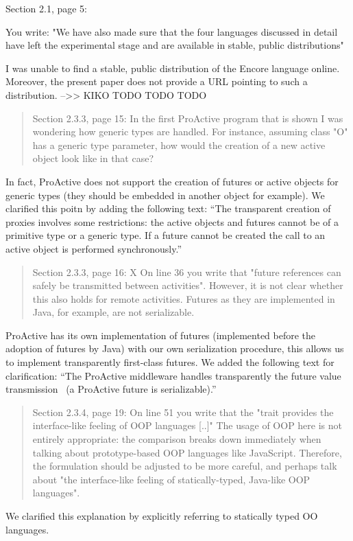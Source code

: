 \documentclass{article}
\begin{document}
Section 2.1, page 5:

You write: "We have also made sure that the four languages discussed in detail have left 
the experimental stage and are available in stable, public distributions"

I was unable to find a stable, public distribution of the Encore language online. 
Moreover, the present paper does not provide a URL pointing to such a distribution.
-->> KIKO
TODO TODO TODO


\begin{quote}
	Section 2.3.3, page 15:
In the first ProActive program that is shown I was wondering how generic types are 
handled. For instance, assuming class "O" has a generic type parameter, how would the 
creation of a new active object look like in that case?
\end{quote}
In fact, ProActive does not support the creation of futures or active objects for generic 
types (they should be embedded in another object for example). We clarified this poitn by 
adding the following text: ``The transparent creation of proxies 
involves some restrictions: the  active 
objects and futures cannot be of a primitive type or a generic type. If a future cannot 
be created the call to an active object is performed synchronously.''

\begin{quote}
	Section 2.3.3, page 16:
X On line 36 you write that "future references can safely be transmitted between 
activities". However, it is not clear whether this also holds for remote activities. 
Futures as they are implemented in Java, for example, are not serializable.
\end{quote}
ProActive has its own implementation of futures (implemented before the adoption of 
futures by Java) with our own serialization procedure, this allows us to implement 
transparently first-class futures. We added the following text for clarification:
``The ProActive middleware handles transparently the 
future value transmission~\cite{HKRZ:Coregrid:2010} (a ProActive future is 
serializable).''

\begin{quote}
	Section 2.3.4, page 19:
On line 51 you write that the "trait provides the interface-like feeling of OOP languages 
[..]" The usage of OOP here is not entirely appropriate: the comparison breaks down 
immediately when talking about prototype-based OOP languages like JavaScript. Therefore, 
the formulation should be adjusted to be more careful, and perhaps talk about "the 
interface-like feeling of statically-typed, Java-like OOP languages".
\end{quote}
We clarified this explanation by explicitly referring to statically typed OO languages.
\end{document}
